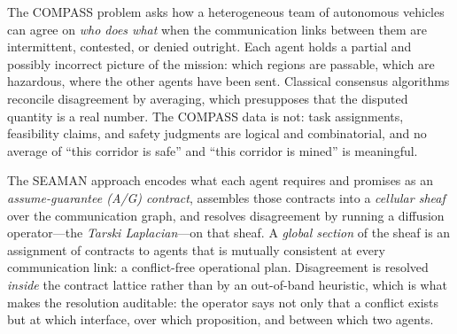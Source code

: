 \documentclass[11pt]{article}
\newif\ifshowcomments
\newcommand{\ProjectAbbrv}{SEAMAN}
\theoremstyle{definition}
\theoremstyle{remark}
\newcommand{\hans}[1]{%
    \ifshowcomments
        \noindent\textcolor{buzzgold}{[Hans]: #1}%
    \fi
}
\newcommand{\ai}[1]{%
    \ifshowcomments
        \noindent\textcolor{techred}{[AI Agent]: #1}%
    \fi
}
\begin{document}
\hans{Suppose $C(x') = \bigl( A(x'), G(x')\bigr)$ is an A/G contract for $x' \in X$. Then, the contract is
\begin{align*}
  R^{\ast} S_{!}(A,G) (x) = \biggl(  \exists y.R(x,y) \wedge \bigl( \forall x'.S(x',y) \Rightarrow A(x') \bigr), \forall y.R(x,y) \Rightarrow \bigl( \exists x'.S(x',y) \wedge G(x')\bigr)\biggr)
\end{align*}}
\ai{Incorporated as \eqref{eq:transport-explicit} in \S\ref{sec:laplacian}, with a plain-language
reading of the quantifier alternation; it also motivates the closed-form transport of
\S\ref{sec:subtask42}.}

The COMPASS problem asks how a heterogeneous team of autonomous vehicles can agree on
\emph{who does what} when the communication links between them are intermittent, contested, or
denied outright.
Each agent holds a partial and possibly incorrect picture of the mission: which regions are
passable, which are hazardous, where the other agents have been sent.
Classical consensus algorithms \citep{olfati-saberConsensusCooperationNetworked2007} reconcile
disagreement by averaging, which presupposes that the disputed quantity is a real number.
The COMPASS data is not: task assignments, feasibility claims, and safety judgments are
logical and combinatorial, and no average of ``this corridor is safe'' and ``this corridor is
mined'' is meaningful.

The \ProjectAbbrv{} approach encodes what each agent requires and promises as an
\emph{assume-guarantee (A/G) contract}, assembles those contracts into a \emph{cellular sheaf}
over the communication graph, and resolves disagreement by running a diffusion operator---the
\emph{Tarski Laplacian}---on that sheaf.
A \emph{global section} of the sheaf is an assignment of contracts to agents that is mutually
consistent at every communication link: a conflict-free operational plan.
Disagreement is resolved \emph{inside} the contract lattice rather than by an out-of-band
heuristic, which is what makes the resolution auditable: the operator says not only that a
conflict exists but at which interface, over which proposition, and between which two agents.
\end{document}
